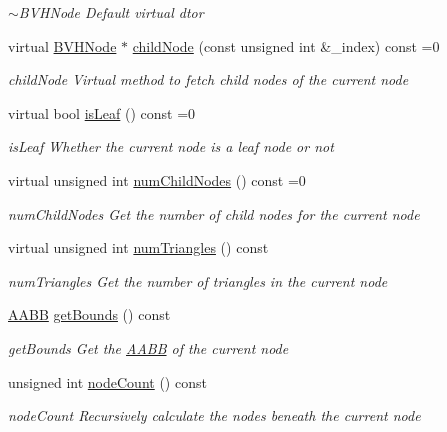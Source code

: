 \begin{DoxyCompactItemize}
\begin{DoxyCompactList}\small\item\em $\sim$\-B\-V\-H\-Node Default virtual dtor \end{DoxyCompactList}\item 
virtual \hyperlink{classBVHNode}{B\-V\-H\-Node} $\ast$ \hyperlink{classBVHNode_acf8b2130dd63bd66e35f130f86c65400}{child\-Node} (const unsigned int \&\-\_\-index) const =0
\begin{DoxyCompactList}\small\item\em child\-Node Virtual method to fetch child nodes of the current node \end{DoxyCompactList}\item 
virtual bool \hyperlink{classBVHNode_a9d6c31fcebf88cc4c128a2b3af1f4cbf}{is\-Leaf} () const =0
\begin{DoxyCompactList}\small\item\em is\-Leaf Whether the current node is a leaf node or not \end{DoxyCompactList}\item 
virtual unsigned int \hyperlink{classBVHNode_ae5ad50686b4c345c98d03f080afc403f}{num\-Child\-Nodes} () const =0
\begin{DoxyCompactList}\small\item\em num\-Child\-Nodes Get the number of child nodes for the current node \end{DoxyCompactList}\item 
virtual unsigned int \hyperlink{classBVHNode_a8a53277e44a407a75e32118ceb4fa425}{num\-Triangles} () const 
\begin{DoxyCompactList}\small\item\em num\-Triangles Get the number of triangles in the current node \end{DoxyCompactList}\item 
\hyperlink{classAABB}{A\-A\-B\-B} \hyperlink{classBVHNode_a6d818bf5517c223d8f7e3fdc9c1f3f37}{get\-Bounds} () const 
\begin{DoxyCompactList}\small\item\em get\-Bounds Get the \hyperlink{classAABB}{A\-A\-B\-B} of the current node \end{DoxyCompactList}\item 
unsigned int \hyperlink{classBVHNode_a5a35ddbaed7b4b4058571f7978938f28}{node\-Count} () const 
\begin{DoxyCompactList}\small\item\em node\-Count Recursively calculate the nodes beneath the current node \end{DoxyCompactList}\item 

\end{DoxyCompactItemize}

